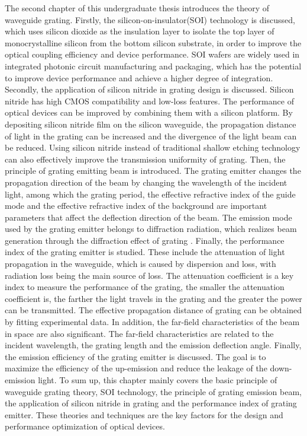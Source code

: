 \documentclass[UTF8,a4paper,12pt]{ctexart}
\numberwithin{equation}{section}
\begin{document}
The second chapter of this undergraduate thesis introduces the theory of waveguide grating.
Firstly, the silicon-on-insulator(SOI) technology is discussed, which uses silicon dioxide as the insulation layer to isolate the top layer of monocrystalline silicon from the bottom silicon substrate, in order to improve the optical coupling efficiency and device performance. SOI wafers are widely used in integrated photonic circuit manufacturing and packaging, which has the potential to improve device performance and achieve a higher degree of integration. Secondly, the application of silicon nitride in grating design is discussed. Silicon nitride has high CMOS compatibility and low-loss features. The performance of optical devices can be improved by combining them with a silicon platform. By depositing silicon nitride film on the silicon waveguide, the propagation distance of light in the grating can be increased and the divergence of the light beam can be reduced. Using silicon nitride instead of traditional shallow etching technology can also effectively improve the transmission uniformity of grating. Then, the principle of grating emitting beam is introduced. The grating emitter changes the propagation direction of the beam by changing the wavelength of the incident light, among which the grating period, the effective refractive index of the guide mode and the effective refractive index of the background are important parameters that affect the deflection direction of the beam. The emission mode used by the grating emitter belongs to diffraction radiation, which realizes beam generation through the diffraction effect of grating
. Finally, the performance index of the grating emitter is studied. These include the attenuation of light propagation in the waveguide, which is caused by dispersion and loss, with radiation loss being the main source of loss. The attenuation coefficient is a key index to measure the performance of the grating, the smaller the attenuation coefficient is, the farther the light travels in the grating and the greater the power can be transmitted. The effective propagation distance of grating can be obtained by fitting experimental data. In addition, the far-field characteristics of the beam in space are also significant. The far-field characteristics are related to the incident wavelength, the grating length and the emission deflection angle. Finally, the emission efficiency of the grating emitter is discussed. The goal is to maximize the efficiency of the up-emission and reduce the leakage of the down-emission light. To sum up, this chapter mainly covers the basic principle of waveguide grating theory, SOI technology, the principle of grating emission beam, the application of silicon nitride in grating and the performance index of grating emitter. These theories and techniques are the key factors for the design and performance optimization of optical devices.
\end{document}
